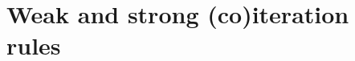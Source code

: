 \documentclass[10pt,a4paper]{amsart}
\theoremstyle{plain}
\theoremstyle{definition}
\newcommand{\red}[1]{{\color{red}#1}}
\theoremstyle{plain}
\theoremstyle{definition} %
\newcommand{\nat}{\mathit{N}}
\newcommand{\N}{\nat} %
\newcommand{\unit}{1}
\newcommand{\seqar}{\Rightarrow}
\newcommand{\cnd}{\mathsf{cond}}
\newcommand{\Nzero}{\rr\N^0}
\newcommand{\Nsucc}{\rr\N^1}
\newcommand{\id}{\mathsf{id}}
\newcommand{\cut}{\mathsf{cut}}
\newcommand{\contr}{\mathsf{c}}
\newcommand{\lr}[1]{#1_l}
\newcommand{\rr}[1]{#1_r}
\newcommand{\rewrite}{\rightsquigarrow}
\newcommand{\cutreduction}{\mathrm{cr}}
\newcommand{\cutred}{\rewrite_{\cutreduction}}
\newcommand{\vldr}[2]{\vltr{#1}{#2}{\vlhy{\ \ \ }}{\vlhy{\ \ \ }}{\vlhy{\ \ \ }}}
\begin{document}



\section{Weak and strong (co)iteration rules}\label{app:simple-types-with-fixed-points}





\end{document}

